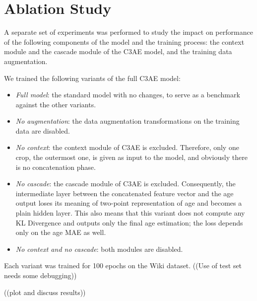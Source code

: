 \section{Ablation Study}
A separate set of experiments was performed to study the impact on performance
of the following components of the model and the training process:
the context module and the cascade module of the C3AE model,
and the training data augmentation.

We trained the following variants of the full C3AE model:

\begin{itemize}
  \item \textit{Full model}: the standard model with no changes,
    to serve as a benchmark against the other variants.
  \item \textit{No augmentation}: the data augmentation transformations
    on the training data are disabled.
  \item \textit{No context}: the context module of C3AE is excluded.
    Therefore, only one crop, the outermost one, is given as input to
    the model, and obviously there is no concatenation phase.
  \item \textit{No cascade}: the cascade module of C3AE is excluded.
    Consequently, the intermediate layer between the concatenated feature vector
    and the age output loses its meaning of two-point representation of age
    and becomes a plain hidden layer. This also means that this variant
    does not compute any KL Divergence and outputs only the final age estimation;
    the loss depends only on the age MAE as well.
  \item \textit{No context and no cascade}: both modules are disabled.
\end{itemize}

Each variant was trained for 100 epochs on the Wiki dataset.
((Use of test set needs some debugging))

((plot and discuss results))
